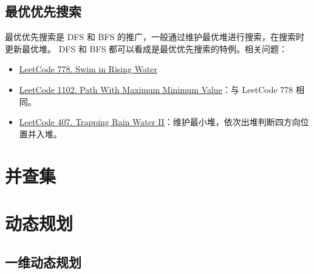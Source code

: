 \subsection{最优优先搜索}
最优优先搜索是 DFS 和 BFS 的推广，一般通过维护最优堆进行搜索，在搜索时更新最优堆。
DFS 和 BFS 都可以看成是最优优先搜索的特例。相关问题：

\begin{itemize}
  \item
    \href{https://leetcode.com/problems/swim-in-rising-water/}{LeetCode 778. Swim in Rising Water}
  \item
    \href{https://leetcode.com/problems/path-with-maximum-minimum-value}{LeetCode
      1102. Path With Maximum Minimum Value}：与 LeetCode 778 相同。
  \item
    \href{https://leetcode.com/problems/trapping-rain-water-ii/}{LeetCode 407.
      Trapping Rain Water II}：维护最小堆，依次出堆判断四方向位置并入堆。
\end{itemize}


\section{并查集}

\section{动态规划}

\subsection{一维动态规划}

